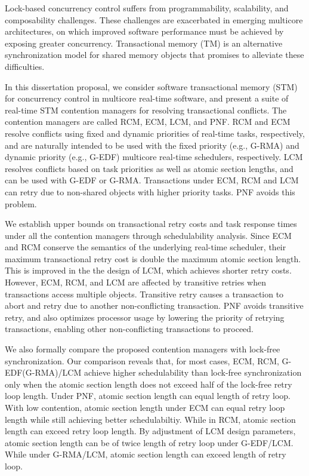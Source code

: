Lock-based concurrency control suffers from programmability, scalability, and composability  challenges. These challenges are exacerbated in emerging multicore architectures, on which improved software performance must be achieved by exposing greater concurrency.   Transactional memory (TM) is an alternative synchronization model for shared memory objects that promises to alleviate these difficulties. 

In this dissertation proposal, we consider software transactional memory (STM) for concurrency control in multicore real-time software, and present a suite of real-time STM contention managers for resolving transactional conflicts. The contention managers are called RCM, ECM, LCM, and PNF. RCM and ECM resolve conflicts using fixed and dynamic priorities of real-time tasks, respectively, and are naturally intended to be used with the fixed priority (e.g., G-RMA) and dynamic priority (e.g., G-EDF) multicore real-time schedulers, respectively. LCM resolves conflicts based on task priorities as well as atomic section lengths, and can be used with G-EDF or G-RMA.
 Transactions under ECM, RCM and LCM can retry due to non-shared objects with higher priority tasks. PNF avoids this problem.

We establish upper bounds on transactional retry costs and task response times under all the contention managers through schedulability analysis. Since ECM and RCM conserve the semantics of the underlying real-time scheduler, their maximum transactional retry cost is double the maximum atomic section length. This is improved in the the design of LCM, which achieves  shorter retry costs.  However, ECM, RCM, and LCM are affected by transitive retries when transactions access multiple objects. 
Transitive retry causes a transaction to abort and retry due to another non-conflicting transaction.  
PNF avoids transitive retry, and also optimizes processor usage by lowering the priority of retrying transactions, enabling other non-conflicting transactions to proceed. 

We also formally compare the proposed contention managers with lock-free synchronization. 
Our comparison reveals that, for most cases, ECM, RCM, G-EDF(G-RMA)/LCM achieve higher schedulability than lock-free synchronization only when the atomic section length does not exceed half of the lock-free retry loop length. Under PNF, atomic section length can equal length of retry loop. With low contention, atomic section length under ECM can equal retry loop length while still achieving better schedulabiltiy. While in RCM, atomic section length can exceed retry loop length. By adjustment of LCM design parameters, atomic section length can be of twice length of retry loop under G-EDF/LCM. While under G-RMA/LCM, atomic section length can exceed length of retry loop.

